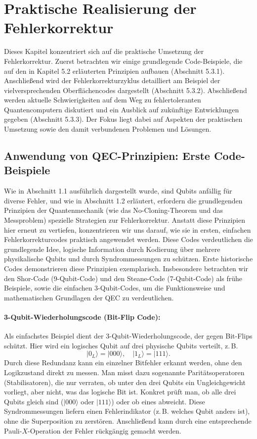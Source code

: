 \section{Praktische Realisierung der Fehlerkorrektur}\label{chap:QEC3}

Dieses Kapitel konzentriert sich auf die praktische Umsetzung der Fehlerkorrektur.
Zuerst betrachten wir einige grundlegende Code-Beispiele, die auf den in Kapitel 5.2 erläuterten Prinzipien aufbauen (Abschnitt 5.3.1). Anschließend wird der Fehlerkorrekturzyklus detailliert am Beispiel der vielversprechenden Oberflächencodes dargestellt (Abschnitt 5.3.2). Abschließend werden aktuelle Schwierigkeiten auf dem Weg zu fehlertoleranten Quantencomputern diskutiert und ein Ausblick auf zukünftige Entwicklungen gegeben (Abschnitt 5.3.3). Der Fokus liegt dabei auf Aspekten der praktischen Umsetzung sowie den damit verbundenen Problemen und Lösungen.

\subsection{Anwendung von QEC-Prinzipien: Erste Code-Beispiele}

Wie in Abschnitt 1.1 ausführlich dargestellt wurde, sind Qubits anfällig für diverse
Fehler, und wie in Abschnitt 1.2 erläutert, erfordern die grundlegenden Prinzipien der
Quantenmechanik (wie das No-Cloning-Theorem und das Messproblem) spezielle
Strategien zur Fehlerkorrektur. Anstatt diese Prinzipien hier erneut zu vertiefen,
konzentrieren wir uns darauf, wie sie in ersten, einfachen Fehlerkorrekturcodes
praktisch angewendet werden. Diese Codes verdeutlichen die grundlegende Idee,
logische Information durch Kodierung über mehrere physikalische Qubits und durch
Syndrommessungen zu schützen.
Erste historische Codes demonstrieren diese Prinzipien exemplarisch. Insbesondere betrachten wir den Shor-Code (9-Qubit-Code) und den Steane-Code (7-Qubit-Code) als frühe Beispiele, sowie die einfachen 3-Qubit-Codes, um die Funktionsweise und mathematischen Grundlagen der QEC zu verdeutlichen.
\cite[Seite 427-430]{nielsen_quantum_2010}\\

\paragraph{3-Qubit-Wiederholungscode (Bit-Flip Code):}
Als einfachstes Beispiel dient der 3-Qubit-Wiederholungscode, der gegen Bit-Flips schützt. Hier wird ein logisches Qubit auf drei physische Qubits verteilt, z.\,B.
\[
\lvert 0_L \rangle = \lvert 000 \rangle, \quad \lvert 1_L \rangle = \lvert 111 \rangle.
\]
Durch diese Redundanz kann ein einzelner Bitfehler erkannt werden, ohne den Logikzustand direkt zu messen. Man misst dazu sogenannte Paritätsoperatoren (Stabilisatoren), die nur verraten, ob unter den drei Qubits ein Ungleichgewicht vorliegt, aber nicht, was das logische Bit ist. Konkret prüft man, ob alle drei Qubits gleich sind (\(\lvert 000 \rangle\) oder \(\lvert 111 \rangle\)) oder ob eines abweicht. Diese Syndrommessungen liefern einen Fehlerindikator (z.\,B. welches Qubit anders ist), ohne die Superposition zu zerstören. Anschließend kann durch eine entsprechende Pauli-\(X\)-Operation der Fehler rückgängig gemacht werden.

